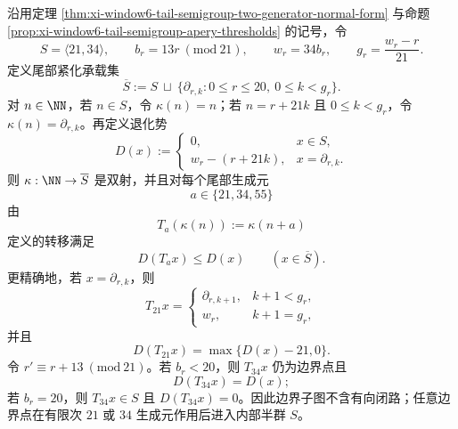 \begin{theorem}\label{distill:grothendieck-compactified_boundary_degeneration_control-xi-apery-tail-boundary-automaton}
沿用定理 \ref{thm:xi-window6-tail-semigroup-two-generator-normal-form} 与命题 \ref{prop:xi-window6-tail-semigroup-apery-thresholds} 的记号，令
\[
S=\langle 21,34\rangle,\qquad b_r=13r\ (\mathrm{mod}\ 21),\qquad w_r=34b_r,\qquad g_r=\frac{w_r-r}{21}.
\]
定义尾部紧化承载集
\[
\overline S:=S\ \sqcup\ \{\partial_{r,k}:0\le r\le20,\ 0\le k<g_r\}.
\]
对 \(n\in\NN\)，若 \(n\in S\)，令 \(\kappa(n)=n\)；若 \(n=r+21k\) 且 \(0\le k<g_r\)，令 \(\kappa(n)=\partial_{r,k}\)。再定义退化势
\[
D(x):=\begin{cases}
0,&x\in S,\\
w_r-(r+21k),&x=\partial_{r,k}.
\end{cases}
\]
则 \(\kappa:\NN\to\overline S\) 是双射，并且对每个尾部生成元
\[
a\in\{21,34,55\}
\]
由
\[
T_a(\kappa(n)):=\kappa(n+a)
\]
定义的转移满足
\[
D(T_a x)\le D(x)\qquad(x\in\overline S).
\]
更精确地，若 \(x=\partial_{r,k}\)，则
\[
T_{21}x=\begin{cases}
\partial_{r,k+1},&k+1<g_r,\\
w_r,&k+1=g_r,
\end{cases}
\]
并且
\[
D(T_{21}x)=\max\{D(x)-21,0\}.
\]
令 \(r'\equiv r+13\ (\mathrm{mod}\ 21)\)。若 \(b_r<20\)，则 \(T_{34}x\) 仍为边界点且
\[
D(T_{34}x)=D(x);
\]
若 \(b_r=20\)，则 \(T_{34}x\in S\) 且 \(D(T_{34}x)=0\)。因此边界子图不含有向闭路；任意边界点在有限次 \(21\) 或 \(34\) 生成元作用后进入内部半群 \(S\)。
\end{theorem}
